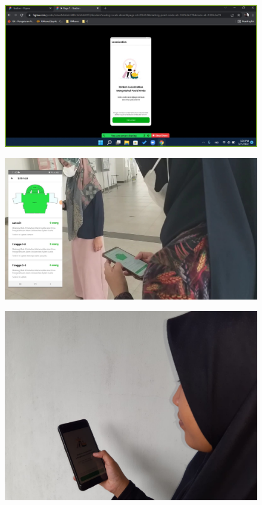 \begin{figure}[H]
  \center
  \includegraphics [width = 13.5 cm, height= 6.75 cm]{gambar/lampiran/umux1.jpeg}
\end{figure}
\begin{figure}[H]
  \center
  \includegraphics [width = 13.5 cm, height= 6.75 cm]{gambar/lampiran/umux5.jpeg}
\end{figure}
\begin{figure}[H]
  \center
  \includegraphics [width = 13.5 cm, height= 6.75 cm]{gambar/lampiran/umux3.jpeg}
\end{figure}
\label{sus-dosen}

